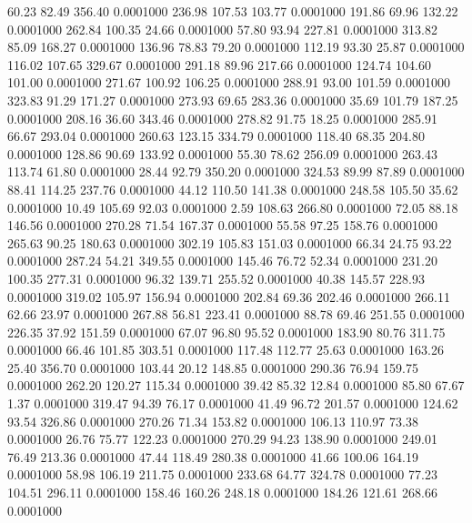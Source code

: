   60.23   82.49  356.40   0.0001000
 236.98  107.53  103.77   0.0001000
 191.86   69.96  132.22   0.0001000
 262.84  100.35   24.66   0.0001000
  57.80   93.94  227.81   0.0001000
 313.82   85.09  168.27   0.0001000
 136.96   78.83   79.20   0.0001000
 112.19   93.30   25.87   0.0001000
 116.02  107.65  329.67   0.0001000
 291.18   89.96  217.66   0.0001000
 124.74  104.60  101.00   0.0001000
 271.67  100.92  106.25   0.0001000
 288.91   93.00  101.59   0.0001000
 323.83   91.29  171.27   0.0001000
 273.93   69.65  283.36   0.0001000
  35.69  101.79  187.25   0.0001000
 208.16   36.60  343.46   0.0001000
 278.82   91.75   18.25   0.0001000
 285.91   66.67  293.04   0.0001000
 260.63  123.15  334.79   0.0001000
 118.40   68.35  204.80   0.0001000
 128.86   90.69  133.92   0.0001000
  55.30   78.62  256.09   0.0001000
 263.43  113.74   61.80   0.0001000
  28.44   92.79  350.20   0.0001000
 324.53   89.99   87.89   0.0001000
  88.41  114.25  237.76   0.0001000
  44.12  110.50  141.38   0.0001000
 248.58  105.50   35.62   0.0001000
  10.49  105.69   92.03   0.0001000
   2.59  108.63  266.80   0.0001000
  72.05   88.18  146.56   0.0001000
 270.28   71.54  167.37   0.0001000
  55.58   97.25  158.76   0.0001000
 265.63   90.25  180.63   0.0001000
 302.19  105.83  151.03   0.0001000
  66.34   24.75   93.22   0.0001000
 287.24   54.21  349.55   0.0001000
 145.46   76.72   52.34   0.0001000
 231.20  100.35  277.31   0.0001000
  96.32  139.71  255.52   0.0001000
  40.38  145.57  228.93   0.0001000
 319.02  105.97  156.94   0.0001000
 202.84   69.36  202.46   0.0001000
 266.11   62.66   23.97   0.0001000
 267.88   56.81  223.41   0.0001000
  88.78   69.46  251.55   0.0001000
 226.35   37.92  151.59   0.0001000
  67.07   96.80   95.52   0.0001000
 183.90   80.76  311.75   0.0001000
  66.46  101.85  303.51   0.0001000
 117.48  112.77   25.63   0.0001000
 163.26   25.40  356.70   0.0001000
 103.44   20.12  148.85   0.0001000
 290.36   76.94  159.75   0.0001000
 262.20  120.27  115.34   0.0001000
  39.42   85.32   12.84   0.0001000
  85.80   67.67    1.37   0.0001000
 319.47   94.39   76.17   0.0001000
  41.49   96.72  201.57   0.0001000
 124.62   93.54  326.86   0.0001000
 270.26   71.34  153.82   0.0001000
 106.13  110.97   73.38   0.0001000
  26.76   75.77  122.23   0.0001000
 270.29   94.23  138.90   0.0001000
 249.01   76.49  213.36   0.0001000
  47.44  118.49  280.38   0.0001000
  41.66  100.06  164.19   0.0001000
  58.98  106.19  211.75   0.0001000
 233.68   64.77  324.78   0.0001000
  77.23  104.51  296.11   0.0001000
 158.46  160.26  248.18   0.0001000
 184.26  121.61  268.66   0.0001000
